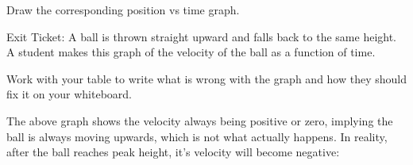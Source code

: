 \documentclass[answers]{exam}
\begin{document}
\begin{questions}
Draw the corresponding position vs time graph.

\begin{solution}
\begin{center}
\end{center}    
\end{solution}

\question 
Exit Ticket: A ball is thrown straight upward and falls back to the same height. A student makes this graph of the velocity of the ball as a function of time. 

\begin{center}
\end{center}

Work with your table to write what is wrong with the graph and how they should fix it on your whiteboard.

\begin{solution}
    The above graph shows the velocity always being positive or zero, implying the ball is always moving upwards, which is not what actually happens. In reality, after the ball reaches peak height, it's velocity will become negative:

    \begin{center}
    \end{center}    
\end{solution}

\clearpage
\begin{EnvUplevel}

\end{EnvUplevel}
\end{questions}
\end{document}
